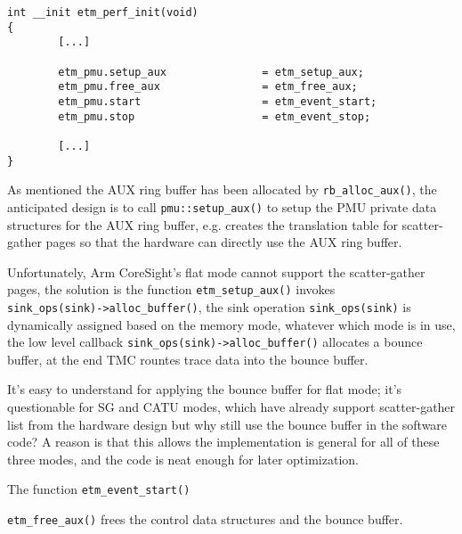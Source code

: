 \documentclass[11pt]{diazessay} %
\def\code#1{\texttt{#1}}
\begin{document}
\begin{lstlisting}
int __init etm_perf_init(void)
{
        [...]

        etm_pmu.setup_aux               = etm_setup_aux;
        etm_pmu.free_aux                = etm_free_aux;
        etm_pmu.start                   = etm_event_start;
        etm_pmu.stop                    = etm_event_stop;

        [...]
}
\end{lstlisting}

As mentioned the AUX ring buffer has been allocated by \code{rb\_alloc\_aux()}, the anticipated design is to call \code{pmu::setup\_aux()} to setup the PMU private data structures for the AUX ring buffer, e.g. creates the translation table for scatter-gather pages so that the hardware can directly use the AUX ring buffer.

Unfortunately, Arm CoreSight's flat mode cannot support the scatter-gather pages, the solution is the function \code{etm\_setup\_aux()} invokes\\\code{sink\_ops(sink)->alloc\_buffer()}, the sink operation \code{sink\_ops(sink)} is dynamically assigned based on the memory mode, whatever which mode is in use, the low level callback \code{sink\_ops(sink)->alloc\_buffer()} allocates a bounce buffer, at the end TMC rountes trace data into the bounce buffer.

It's easy to understand for applying the bounce buffer for flat mode; it's questionable for SG and CATU modes, which have already support scatter-gather list from the hardware design but why still use the bounce buffer in the software code?  A reason is that this allows the implementation is general for all of these three modes, and the code is neat enough for later optimization.

The function \code{etm\_event\_start()}

\code{etm\_free\_aux()} frees the control data structures and the bounce buffer.
\end{document}
